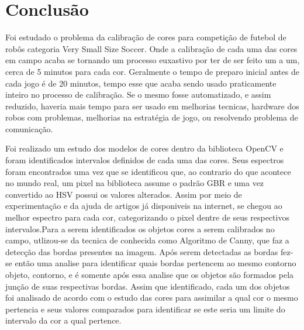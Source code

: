 
\chapter{Conclusão} \label{Cap:Conclusao}


Foi estudado o problema da calibração de cores para competição de futebol de robôs categoria Very Small Size Soccer. Onde a calibração de cada uma das cores em campo acaba se tornando um processo euxastivo por ter de ser feito um a um, cerca de 5 minutos para cada cor. Geralmente o tempo de preparo inicial antes de cada jogo é de 20 minutos, tempo esse que acaba sendo usado praticamente inteiro no processo de calibração. Se o mesmo fosse automatizado, e assim reduzido, haveria mais tempo para ser usado em melhorias tecnicas, hardware dos robos com problemas, melhorias na estratégia de jogo, ou resolvendo problema de comunicação.

	Foi realizado um estudo dos modelos de cores dentro da biblioteca OpenCV e foram identificados intervalos definidos de cada uma das cores. Seus espectros foram encontrados uma vez que se identificou que, ao contrario do que acontece no mundo real, um pixel na biblioteca assume o  padrão GBR e uma vez convertido ao HSV possui os valores alterados. Assim por meio de experimentação e da ajuda de artigos já disponiveis na internet, se chegou ao melhor espectro para cada cor, categorizando o pixel dentre de seus respectivos intervalos.Para a serem identificados os objetos cores a serem calibrados no campo, utlizou-se da tecnica de conhecida como Algoritmo de Canny, que faz a detecção das bordas presentes na imagem. Após serem detectadas as bordas fez-se então uma analise para identificar quais bordas pertencem ao mesmo contorno objeto, contorno, e é somente após essa analise que os objetos são formados pela junção de suas respectivas bordas. Assim que identificado, cada um dos objetos foi analisado de acordo com o estudo das cores para assimilar a qual cor o mesmo pertencia e seus valores comparados para identificar se este seria um limite do intervalo da cor a qual pertence.

